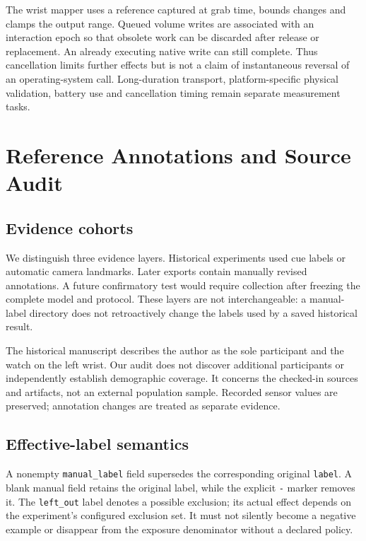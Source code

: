 The wrist mapper uses a reference captured at grab time, bounds changes and clamps the output range. Queued volume writes are associated with an interaction epoch so that obsolete work can be discarded after release or replacement. An already executing native write can still complete. Thus cancellation limits further effects but is not a claim of instantaneous reversal of an operating-system call. Long-duration transport, platform-specific physical validation, battery use and cancellation timing remain separate measurement tasks.

\section{Reference Annotations and Source Audit}\label{reference-annotations-and-source-audit}

\subsection{Evidence cohorts}\label{evidence-cohorts}

We distinguish three evidence layers. Historical experiments used cue labels or automatic camera landmarks. Later exports contain manually revised annotations. A future confirmatory test would require collection after freezing the complete model and protocol. These layers are not interchangeable: a manual-label directory does not retroactively change the labels used by a saved historical result.

The historical manuscript describes the author as the sole participant and the watch on the left wrist. Our audit does not discover additional participants or independently establish demographic coverage. It concerns the checked-in sources and artifacts, not an external population sample. Recorded sensor values are preserved; annotation changes are treated as separate evidence.

\subsection{Effective-label semantics}\label{effective-label-semantics}

A nonempty \nolinkurl{manual_label} field supersedes the corresponding original \nolinkurl{label}. A blank manual field retains the original label, while the explicit \nolinkurl{-} marker removes it. The \nolinkurl{left_out} label denotes a possible exclusion; its actual effect depends on the experiment's configured exclusion set. It must not silently become a negative example or disappear from the exposure denominator without a declared policy.

